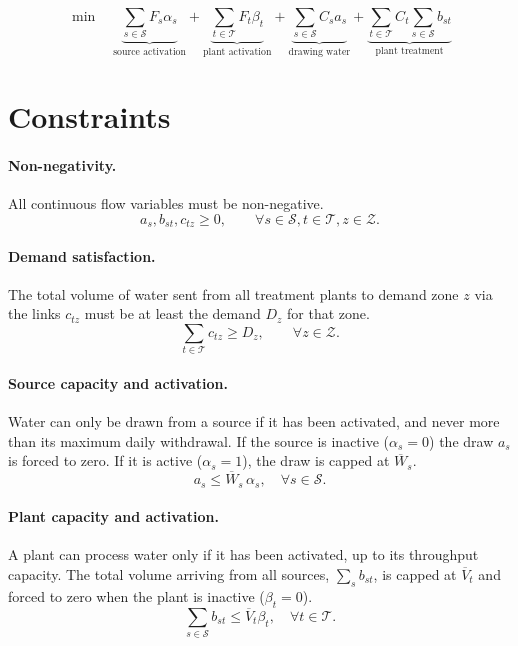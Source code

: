 \documentclass[10pt]{article}
\begin{document}
\begin{equation}
    \min \quad
    \underbrace{\sum_{s \in \mathcal{S}} F_s \alpha_s}_{\text{source activation}}
    + \underbrace{\sum_{t \in \mathcal{T}} F_t \beta_t}_{\text{plant activation}}
    + \underbrace{\sum_{s \in \mathcal{S}} C_s a_s}_{\text{drawing water}}
    + \underbrace{\sum_{t \in \mathcal{T}} C_t \sum_{s \in \mathcal{S}} b_{st}}_{\text{plant treatment}}
\end{equation}

\section{Constraints}
\paragraph{Non-negativity.} All continuous flow variables must be non-negative.
\begin{equation}
    a_s, b_{st}, c_{tz} \ge 0, \qquad \forall s \in \mathcal{S}, t \in \mathcal{T}, z \in \mathcal{Z}.
\end{equation}

\paragraph{Demand satisfaction.} The total volume of water sent from all treatment plants to demand zone $z$ via the links $c_{tz}$ must be at least the demand $D_z$ for that zone.
\begin{equation}
    \sum_{t \in \mathcal{T}} c_{tz} \ge D_z, \qquad \forall z \in \mathcal{Z}.
\end{equation}
\paragraph{Source capacity and activation.} Water can only be drawn from a source if it has been activated, and never more than its maximum daily withdrawal.
If the source is inactive ($\alpha_s = 0$) the draw $a_s$ is forced to zero.
If it is active ($\alpha_s = 1$), the draw is capped at $\overline{W}_s$.
\begin{equation}\label{eq:source_capacity}
    a_{s} \le \overline{W}_s\,\alpha_s, \quad \forall s \in \mathcal{S}.
\end{equation}

\paragraph{Plant capacity and activation.} A plant can process water only if it has been activated, up to its throughput capacity.
The total volume arriving from all sources, $\sum_s b_{st}$, is capped at $\overline{V}_t$ and forced to zero when the plant is inactive ($\beta_t = 0$).
\begin{equation}\label{eq:plant_capacity}
    \sum_{s \in \mathcal{S}} b_{st} \le \overline{V}_t \beta_t, \quad \forall t \in \mathcal{T}.
\end{equation}
\end{document}

